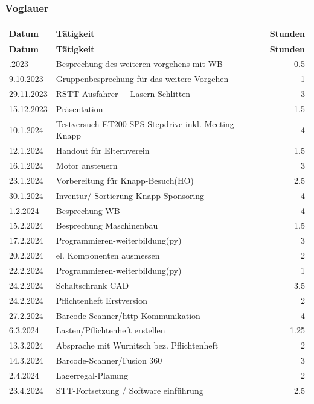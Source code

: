 \subsubsection{Voglauer}
\begin{longtable}{|l|p{10cm}|r|}
    \hline
    \textbf{Datum} & \textbf{Tätigkeit} & \textbf{Stunden} \\
    \hline
    \endfirsthead

    \hline
    \textbf{Datum} & \textbf{Tätigkeit} & \textbf{Stunden} \\
    \hline
    \endhead

    \hline
    \endfoot

    \hline
    \endlastfoot 
    4.10.2023	&	Besprechung des weiteren vorgehens mit WB	&	0.5	\\
9.10.2023	&	Gruppenbesprechung für das weitere Vorgehen	&	1	\\
29.11.2023	&	RSTT Ausfahrer + Lasern Schlitten	&	3	\\
15.12.2023	&	Präsentation	&	1.5	\\
10.1.2024	&	Testversuch ET200 SPS Stepdrive inkl. Meeting Knapp	&	4	\\
12.1.2024	&	Handout für Elternverein	&	1.5	\\
16.1.2024	&	Motor ansteuern	&	3	\\
23.1.2024	&	Vorbereitung für Knapp-Besuch(HO)	&	2.5	\\
30.1.2024	&	Inventur/ Sortierung Knapp-Sponsoring	&	4	\\
1.2.2024	&	Besprechung WB	&	4	\\
15.2.2024	&	Besprechung Maschinenbau	&	1.5	\\
17.2.2024	&	Programmieren-weiterbildung(py)	&	3	\\
20.2.2024	&	el. Komponenten ausmessen 	&	2	\\
22.2.2024	&	Programmieren-weiterbildung(py)	&	1	\\
24.2.2024	&	Schaltschrank CAD	&	3.5	\\
24.2.2024	&	Pflichtenheft Erstversion	&	2	\\
27.2.2024	&	Barcode-Scanner/http-Kommunikation	&	4	\\
6.3.2024	&	Lasten/Pflichtenheft erstellen	&	1.25	\\
13.3.2024	&	Absprache mit Wurnitsch bez. Pflichtenheft	&	2	\\
14.3.2024	&	Barcode-Scanner/Fusion 360	&	3	\\
2.4.2024	&	Lagerregal-Planung	&	2	\\
23.4.2024	&	STT-Fortsetzung / Software einführung	&	2.5	\\

\end{longtable}
